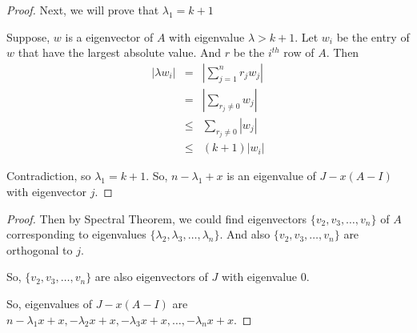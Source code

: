 \documentclass{beamer}
\begin{document}
                  \begin{frame}
                        \begin{proof}
                              Next, we will prove that $\lambda_{1} = k+1$

                              Suppose, $w$ is a eigenvector of $A$ with eigenvalue $\lambda > k+1$. Let $w_{i}$ be the entry of $w$ that have the largest absolute value. And $r$ be the $i^{th}$ row of $A$. Then
                              \begin{eqnarray}
                                    \left|\lambda w_{i}\right| &=& \left|\sum_{j=1}^{n}r_{j}w_{j}\right| \\
                                    &=& \left|\sum_{r_{j} \neq 0}w_{j}\right| \\
                                    &\le& \sum_{r_{j} \neq 0}\left|w_{j}\right| \\
                                    &\le& (k+1) \left|w_{i}\right|
                              \end{eqnarray}

                              Contradiction, so $\lambda_{1} = k+1$. So, $n-\lambda_{1}+x$ is an eigenvalue of $J - x(A-I)$ with eigenvector $j$.
                        \end{proof}
                  \end{frame}

                  \begin{frame}
                        \begin{proof}
                              Then by Spectral Theorem, we could find eigenvectors $\{v_{2},v_{3},\dots,v_{n}\}$ of $A$ corresponding to eigenvalues $\{\lambda_{2},\lambda_{3},\dots,\lambda_{n}\}$. And also $\{v_{2},v_{3},\dots,v_{n}\}$ are orthogonal to $j$.

                              So, $\{v_{2},v_{3},\dots,v_{n}\}$ are also eigenvectors of $J$ with eigenvalue $0$.

                              So, eigenvalues of $J - x(A-I)$ are $n-\lambda_{1}x+x,-\lambda_{2}x+x,-\lambda_{3}x+x,\dots,-\lambda_{n}x+x$. 
                        \end{proof}
                  \end{frame}
\end{document}
